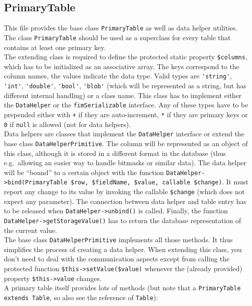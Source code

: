 \documentclass{scrartcl}
\begin{document}
   \subsection{PrimaryTable}
      This file provides the base class \lstinline!PrimaryTable! as well as data helper utilities. The class \lstinline!PrimaryTable! should be used as a superclass for every table that contains at least one primary key. \\
      The extending class is required to define the protected static property \lstinline!$columns!, which has to be initialized as an associative array. The keys correspond to the column names, the values indicate the data type. Valid types are \lstinline!'string'!, \lstinline!'int'!, \lstinline!'double'!, \lstinline!'bool'!, \lstinline!'blob'! (which will be represented as a string, but has different internal handling) or a class name. This class has to implement either the \lstinline!DataHelper! or the \lstinline!fimSerializable! interface. Any of these types have to be prepended either with \texttt{+} if they are auto-increment, \texttt{*} if they are primary keys or \texttt{0} if \lstinline!null! is allowed (not for data helpers). \\
      Data helpers are classes that implement the \lstinline!DataHelper! interface or extend the base class \lstinline!DataHelperPrimitive!. The column will be represented as an object of this class, although it is stored in a different format in the database (thus e.g.\ allowing an easier way to handle bitmasks or similar data). The data helper will be ``bound'' to a certain object with the function \lstinline!DataHelper->bind(PrimaryTable $row, $fieldName, $value, callable $change)!. It must report any change to its value by invoking the callable \lstinline!$change! (which does not expect any parameter). The connection between data helper and table entry has to be released when \lstinline!DataHelper->unbind()! is called. Finally, the function \lstinline!DataHelper->getStorageValue()! has to return the database representation of the current value. \\
      The base class \lstinline!DataHelperPrimitive! implements all those methods. It thus simplifies the process of creating a data helper. When extending this class, you don't need to deal with the communication aspects except from calling the protected function \lstinline!$this->setValue($value)! whenever the (already provided) property \lstinline!$this->value! changes. \\
      A primary table itself provides lots of methods (but note that a \lstinline!PrimaryTable extends Table!, so also see the reference of \lstinline!Table!):
\end{document}
